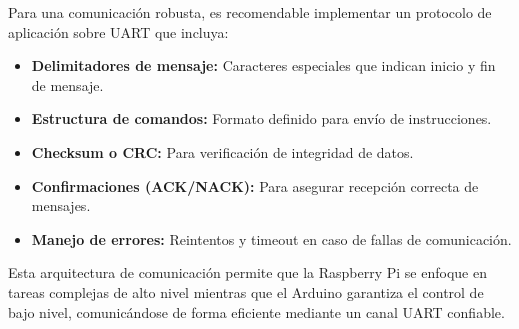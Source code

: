 Para una comunicación robusta, es recomendable implementar un protocolo de aplicación sobre UART que incluya:

\begin{itemize}
    \item \textbf{Delimitadores de mensaje:} Caracteres especiales que indican inicio y fin de mensaje.
    \item \textbf{Estructura de comandos:} Formato definido para envío de instrucciones.
    \item \textbf{Checksum o CRC:} Para verificación de integridad de datos.
    \item \textbf{Confirmaciones (ACK/NACK):} Para asegurar recepción correcta de mensajes.
    \item \textbf{Manejo de errores:} Reintentos y timeout en caso de fallas de comunicación.
\end{itemize}

Esta arquitectura de comunicación permite que la Raspberry Pi se enfoque en tareas complejas de alto nivel mientras que el Arduino garantiza el control de bajo nivel, comunicándose de forma eficiente mediante un canal UART confiable.
